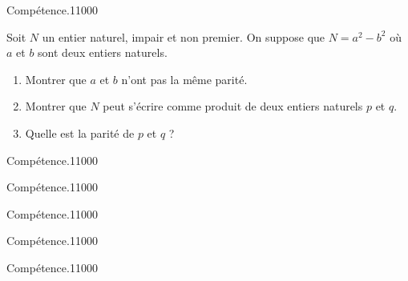 \begin{pageParcourst} %

\begin{ExoCtN}{Compétence.}{1}{1}{0}{0}{0}
 

Soit $N$ un entier naturel, impair et non premier. On suppose que $N=a^2-b^2$ où $a$ et $b$ sont deux entiers naturels.

\begin{enumerate}
\item Montrer que $a$ et $b$ n'ont pas la même parité.
\item Montrer que $N$ peut s'écrire comme produit de deux entiers naturels $p$ et $q$.
\item Quelle est la parité de $p$ et $q$ ? 
\end{enumerate}
 
\end{ExoCtN}

\begin{ExoCtN}{Compétence.}{1}{1}{0}{0}{0}
 
\end{ExoCtN}

\begin{ExoCtN}{Compétence.}{1}{1}{0}{0}{0}
 
\end{ExoCtN}

\begin{ExoCtN}{Compétence.}{1}{1}{0}{0}{0}
 
\end{ExoCtN}

\begin{ExoCtN}{Compétence.}{1}{1}{0}{0}{0}
 
\end{ExoCtN}

\begin{ExoCtN}{Compétence.}{1}{1}{0}{0}{0}
 
\end{ExoCtN}
 
\end{pageParcourst} %


